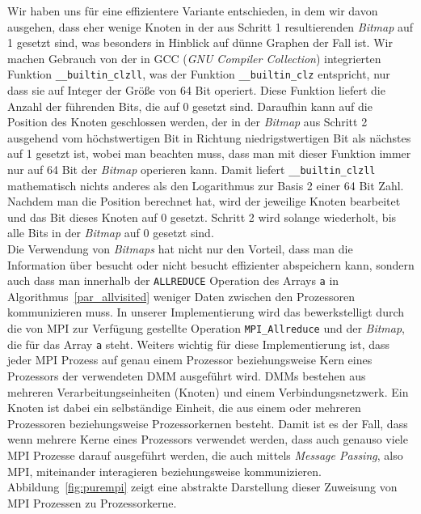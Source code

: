 \documentclass[11pt,a4paper]{article}
\begin{document}
Wir haben uns für eine effizientere Variante entschieden, in dem wir davon ausgehen, dass eher wenige Knoten in der aus Schritt 1 resultierenden \textit{Bitmap} auf 1 gesetzt sind, was besonders in Hinblick auf dünne Graphen der Fall ist. Wir machen Gebrauch von der in GCC (\textit{GNU Compiler Collection}) integrierten Funktion \lstinline{__builtin_clzll}, was der Funktion \lstinline{__builtin_clz} entspricht, nur dass sie auf Integer der Größe von 64 Bit operiert. Diese Funktion liefert die Anzahl der führenden Bits, die auf 0 gesetzt sind. Daraufhin kann auf die Position des Knoten geschlossen werden, der in der \textit{Bitmap} aus Schritt 2 ausgehend vom höchstwertigen Bit in Richtung niedrigstwertigen Bit als nächstes auf 1 gesetzt ist, wobei man beachten muss, dass man mit dieser Funktion immer nur auf 64 Bit der \textit{Bitmap} operieren kann. Damit liefert \lstinline{__builtin_clzll} mathematisch nichts anderes als den Logarithmus zur Basis 2 einer 64 Bit Zahl. Nachdem man die Position berechnet hat, wird der jeweilige Knoten bearbeitet und das Bit dieses Knoten auf 0 gesetzt. Schritt 2 wird solange wiederholt, bis alle Bits in der \textit{Bitmap} auf 0 gesetzt sind.\\
Die Verwendung von \textit{Bitmaps} hat nicht nur den Vorteil, dass man die Information über besucht oder nicht besucht effizienter abspeichern kann, sondern auch dass man innerhalb der \lstinline{ALLREDUCE} Operation des Arrays \lstinline{a} in Algorithmus~\ref{par_allvisited} weniger Daten zwischen den Prozessoren kommunizieren muss. In unserer Implementierung wird das bewerkstelligt durch die von MPI zur Verfügung gestellte Operation \lstinline{MPI_Allreduce} und der \textit{Bitmap}, die für das Array \lstinline{a} steht. Weiters wichtig für diese Implementierung ist, dass jeder MPI Prozess auf genau einem Prozessor beziehungsweise Kern eines Prozessors der verwendeten DMM ausgeführt wird. DMMs bestehen aus mehreren Verarbeitungseinheiten (Knoten) und einem Verbindungsnetzwerk. Ein Knoten ist dabei ein selbständige Einheit, die aus einem oder mehreren Prozessoren beziehungsweise Prozessorkernen besteht. Damit ist es der Fall, dass wenn mehrere Kerne eines Prozessors verwendet werden, dass auch genauso viele MPI Prozesse darauf ausgeführt werden, die auch mittels \textit{Message Passing}, also MPI, miteinander interagieren beziehungsweise kommunizieren. Abbildung~\ref{fig:purempi} zeigt eine abstrakte Darstellung dieser Zuweisung von MPI Prozessen zu Prozessorkerne.
\end{document}
